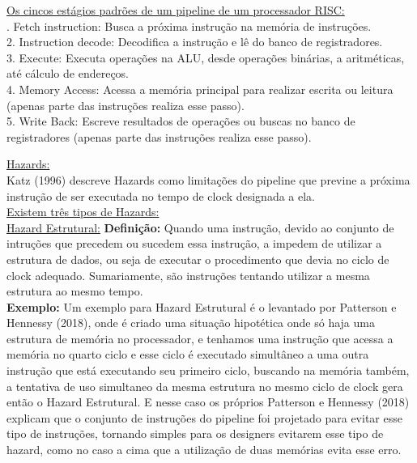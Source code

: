 \documentclass[10pt]{article}
\begin{document}
\ul{Os cincos est{\'a}gios padr{\~o}es de um pipeline de um processador RISC:}\\. Fetch instruction: Busca a pr{\'o}xima instru{\c c}{\~a}o na mem{\'o}ria de instru{\c c}{\~o}es.\\
2. Instruction decode: Decodifica a instru{\c c}{\~a}o e l{\^e} do banco de registradores.\\
3. Execute: Executa opera{\c c}{\~o}es na ALU, desde opera{\c c}{\~o}es bin{\'a}rias, a aritm{\'e}ticas, at{\'e} c{\'a}lculo de endere{\c c}os.\\
4. Memory Access: Acessa a mem{\'o}ria principal para realizar escrita ou leitura (apenas parte das instru{\c c}{\~o}es realiza esse passo).\\
5. Write Back: Escreve resultados de opera{\c c}{\~o}es ou buscas no banco de registradores (apenas parte das instru{\c c}{\~o}es realiza esse passo).\\  \bigskip\bigskip\bigskip\bigskip\bigskip\bigskip\bigskip\bigskip\bigskip\bigskip\bigskip\bigskip\bigskip\bigskip\bigskip\bigskip\bigskip


\ul{Hazards:}\\
\medskip
Katz (1996) descreve Hazards como limita{\c c}{\~o}es do pipeline que previne  a pr{\'o}xima instru{\c c}{\~a}o de ser executada no tempo de clock designada a ela. 
\\\bigskip
\ul{Existem tr{\^e}s tipos de Hazards:}\\\bigskip
\ul{Hazard Estrutural:} \textbf{Defini{\c c}{\~a}o:} Quando uma instru{\c c}{\~a}o, devido ao conjunto de intru{\c c}{\~o}es que precedem ou sucedem essa instru{\c c}{\~a}o, a impedem de utilizar a estrutura de dados, ou seja de executar o procedimento que devia no ciclo de clock adequado. Sumariamente, s{\~a}o instru{\c c}{\~o}es tentando utilizar a mesma estrutura ao mesmo tempo.\\
\textbf{Exemplo:} Um exemplo para Hazard Estrutural {\'e} o levantado por Patterson e Hennessy (2018), onde {\'e} criado uma situa{\c c}{\~a}o hipot{\'e}tica onde s{\'o} haja uma estrutura de mem{\'o}ria no processador, e tenhamos uma instru{\c c}{\~a}o que acessa a mem{\'o}ria no quarto ciclo e esse ciclo {\'e} executado simult{\^a}neo a uma outra instru{\c c}{\~a}o que est{\'a} executando seu primeiro ciclo, buscando na mem{\'o}ria tamb{\'e}m, a tentativa de uso simultaneo da mesma estrutura no mesmo ciclo de clock gera ent{\~a}o o Hazard Estrutural. E nesse caso os pr{\'o}prios Patterson e Hennessy (2018) explicam que o conjunto de instru{\c c}{\~o}es do pipeline foi projetado para evitar esse tipo de instru{\c c}{\~o}es, tornando simples para os designers evitarem esse tipo de hazard, como no caso a cima que a utiliza{\c c}{\~a}o de duas mem{\'o}rias evita esse erro.\medskip
\end{document}

